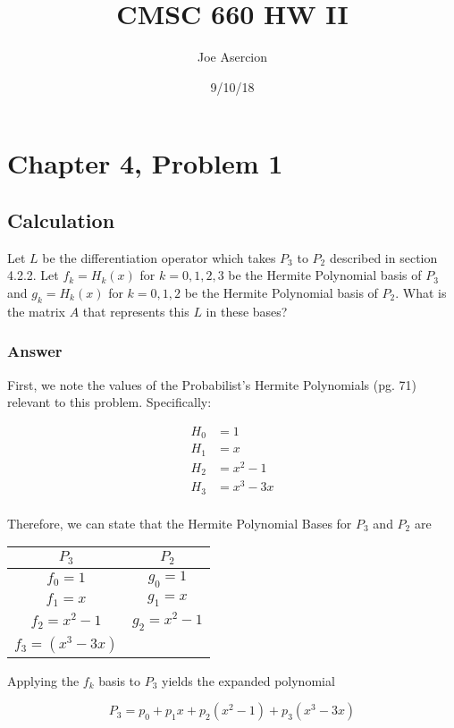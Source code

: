 \documentclass{article}
\title{CMSC 660 HW II}
\date{9/10/18}
\author{Joe Asercion}
\begin{document}
	\maketitle
	\section{Chapter 4, Problem 1}
		\subsection{Calculation}
		Let $L$ be the differentiation operator which takes $P_{3}$ to $P_{2}$ described in section 4.2.2.  Let $f_{k}=H_{k}(x)$ for $k=0,1,2,3$ be the Hermite Polynomial basis of $P_{3}$ and $g_{k}=H_{k}(x)$ for $k=0,1,2$ be the Hermite Polynomial basis of $P_{2}$.  What is the matrix $A$ that represents this $L$ in these bases?
		
		\subsubsection{Answer}
		
		First, we note the values of the Probabilist's Hermite Polynomials \cite{BG}(pg. 71)\cite{wiki_hermite} relevant to this problem.  Specifically:
		
		\begin{align*}
			H_{0}&=1 \\
			H_{1}&=x \\
			H_{2}&=x^{2}-1 \\ 
			H_{3}&=x^{3}-3x \\
		\end{align*}

		Therefore, we can state that the Hermite Polynomial Bases for $P_{3}$ and $P_{2}$ are
		
		\begin{center}
		\begin{tabular}{ c c }
			$P_{3}$ & $P_{2}$ \\
			\hline
			$f_{0}=1$ & $g_{0}=1$ \\
			$f_{1}=x$ & $g_{1}=x$ \\
			$f_{2}=x^{2}-1$ & $g_{2}=x^{2}-1$ \\
			$f_{3}=(x^{3}-3x)$ & 
		\end{tabular}
		\end{center}
		
		Applying the $f_{k}$ basis to $P_{3}$ yields the expanded polynomial 
		
		\begin{center}
			\begin{equation}
				P_{3}=p_{0}+p_{1}x+p_{2}(x^{2}-1)+p_{3}(x^{3}-3x)
			\end{equation}
		\end{center}
		
\end{document}
